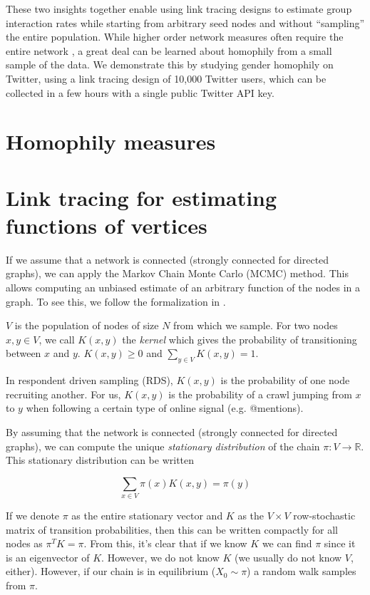 \documentclass[a4paper]{article}
\begin{document}
These two insights together enable using link tracing designs to estimate group interaction rates while starting from arbitrary seed nodes and without ``sampling'' the entire population. While higher order network measures often require the entire network \cite{kossinets_effects_2006}, a great deal can be learned about homophily from a small sample of the data. We demonstrate this by studying gender homophily on Twitter, using a link tracing design of 10,000 Twitter users, which can be collected in a few hours with a single public Twitter API key.

\section{Homophily measures}

\section{Link tracing for estimating functions of vertices}

If we assume that a network is connected (strongly connected for directed graphs), we can apply the Markov Chain Monte Carlo (MCMC) method. This allows computing an unbiased estimate of an arbitrary function of the nodes in a graph. To see this, we follow the formalization in \cite{goel_respondent-driven_2009}.

$V$ is the population of nodes of size $N$ from which we sample. For two nodes $x, y \in V$, we call $K(x, y)$ the \emph{kernel} which gives the probability of transitioning between $x$ and $y$. $K(x, y) \ge 0$ and $\sum_{y \in V} K(x, y) = 1$.

In respondent driven sampling (RDS), $K(x, y)$ is the probability of one node recruiting another. For us, $K(x, y)$ is the probability of a crawl jumping from $x$ to $y$ when following a certain type of online signal (e.g. @mentions).

By assuming that the network is connected (strongly connected for directed graphs), we can compute the unique \emph{stationary distribution} of the chain $\pi: V \to \mathbb{R}$. This stationary distribution can be written

\begin{equation}
\sum_{x \in V} \pi(x) K(x, y) = \pi(y)
\end{equation}

If we denote $\pi$ as the entire stationary vector and $K$ as the $V \times V$ row-stochastic matrix of transition probabilities, then this can be written compactly for all nodes as $\pi^T K = \pi$. From this, it's clear that if we know $K$ we can find $\pi$ since it is an eigenvector of $K$. However, we do not know $K$ (we usually do not know $V$, either). However, if our chain is in equilibrium ($X_0 \sim \pi$) a random walk samples from $\pi$.
\end{document}
